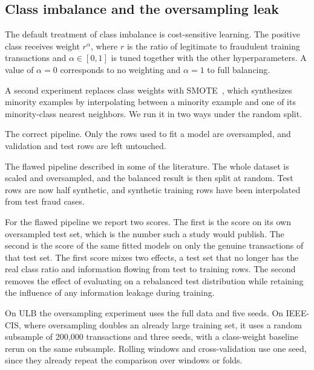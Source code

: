 \subsection{Class imbalance and the oversampling leak}
\label{sec:imbalance}

The default treatment of class imbalance is cost-sensitive learning. The positive class receives weight $r^{\alpha}$, where $r$ is the ratio of legitimate to fraudulent training transactions and $\alpha \in [0,1]$ is tuned together with the other hyperparameters. A value of $\alpha=0$ corresponds to no weighting and $\alpha=1$ to full balancing.

A second experiment replaces class weights with SMOTE~\cite{chawla2002smote}, which synthesizes minority examples by interpolating between a minority example and one of its minority-class nearest neighbors. We run it in two ways under the random split.

\begin{description}[leftmargin=1em,itemsep=2pt]
\item[SMOTE on training rows.] The correct pipeline. Only the rows used to fit a model are oversampled, and validation and test rows are left untouched.
\item[SMOTE before the split.] The flawed pipeline described in some of the literature. The whole dataset is scaled and oversampled, and the balanced result is then split at random. Test rows are now half synthetic, and synthetic training rows have been interpolated from test fraud cases.
\end{description}

For the flawed pipeline we report two scores. The first is the score on its own oversampled test set, which is the number such a study would publish. The second is the score of the same fitted models on only the genuine transactions of that test set. The first score mixes two effects, a test set that no longer has the real class ratio and information flowing from test to training rows. The second removes the effect of evaluating on a rebalanced test distribution while retaining the influence of any information leakage during training.

On ULB the oversampling experiment uses the full data and five seeds. On IEEE-CIS, where oversampling doubles an already large training set, it uses a random subsample of 200{,}000 transactions and three seeds, with a class-weight baseline rerun on the same subsample. Rolling windows and cross-validation use one seed, since they already repeat the comparison over windows or folds.

